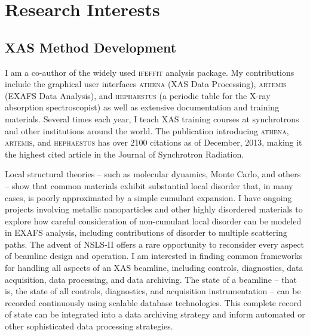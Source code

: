 \documentclass[11pt]{moderncv}
\begin{document}
\section{Research Interests}

\subsection{XAS Method Development}
%
{I am a co-author of the widely used \textsc{ifeffit} analysis
  package.  My contributions include the graphical user interfaces
  \textsc{athena} (XAS Data Processing), \textsc{artemis} (EXAFS Data
  Analysis), and \textsc{hephaestus} (a periodic table for the X-ray
  absorption spectroscopist) as well as extensive documentation and
  training materials.  Several times each year, I teach XAS training
  courses at synchrotrons and other institutions around the
  world. \newline{} The publication introducing \textsc{athena},
  \textsc{artemis}, and \textsc{hephaestus} has over 2100 citations as
  of December, 2013, making it the highest cited article in the Journal
  of Synchrotron Radiation.}

%
{Local structural theories -- such as molecular dynamics, Monte Carlo,
  and others -- show that common materials exhibit substantial local
  disorder that, in many cases, is poorly approximated by a simple
  cumulant expansion.  I have ongoing projects involving metallic
  nanoparticles and other highly disordered materials to explore how
  careful consideration of non-cumulant local disorder can be modeled
  in EXAFS analysis, including contributions of disorder to multiple
  scattering paths.}
%
%
{The advent of NSLS-II offers a rare opportunity to reconsider every
  aspect of beamline design and operation.  I am interested in finding
  common frameworks for handling all aspects of an XAS beamline,
  including controls, diagnostics, data acquisition, data processing,
  and data archiving.  The state of a beamline -- that is, the state
  of all controls, diagnostics, and acquisition instrumentation -- can
  be recorded continuously using scalable database technologies.  This
  complete record of state can be integrated into a data archiving
  strategy and inform automated or other sophisticated data processing
  strategies.}
\end{document}
